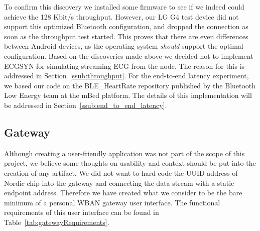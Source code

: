 To confirm this discovery we installed some firmware \cite{nordic:throughputtest} to see if we indeed could achieve the 128 Kbit/s throughput. However, our LG G4 test device did not support this optimized Bluetooth configuration, and dropped the connection as soon as the throughput test started. This proves that there are even differences between Android devices, as the operating system \emph{should} support the optimal configuration. Based on the discoveries made above we decided not to implement ECGSYN for simulating streaming ECG from the node. The reason for this is addressed in Section~\ref{ssub:throughput}. For the end-to-end latency experiment, we based our code on the BLE\_HeartRate repository \cite{mbed:bleheartrate} published by the Bluetooth Low Energy team at the mBed platform. The details of this implementation will be addressed in Section~\ref{ssub:end_to_end_latency}.


\subsection{Gateway} %
\label{sub:gateway}

Although creating a user-friendly application was not part of the scope of this project, we believe some thoughts on usability and context should be put into the creation of any artifact. We did not want to hard-code the UUID address of Nordic chip into the gateway and connecting the data stream with a static endpoint address. Therefore we have created what we consider to be the bare minimum of a personal WBAN gateway user interface. The functional requirements of this user interface can be found in Table~\ref{tab:gatewayRequirements}.

